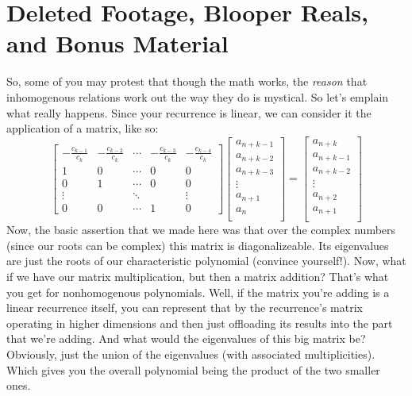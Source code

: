 \documentclass[12pt,letterpaper]{article}
\begin{document}
\section{Deleted Footage, Blooper Reals, and Bonus Material}
So, some of you may protest that though the math works, the \emph{reason} that
inhomogenous relations work out the way they do is mystical. So let's emplain
what really happens. Since your recurrence is linear, we can consider it the
application of a matrix, like so:
$$
\left[ \begin{array}{ccccc}
-\frac{c_{k-1}}{c_k} & -\frac{c_{k-2}}{c_k} & \cdots & -\frac{c_{k-3}}{c_k} & -\frac{c_{k-4}}{c_k} \\
1 & 0 & \cdots & 0 & 0 \\
0 & 1 & \cdots & 0 & 0 \\
\vdots && \ddots && \vdots \\
0 & 0 & \cdots & 1 & 0
\end{array} \right] \left[ \begin{array}{c}
a_{n+k-1} \\
a_{n+k-2} \\
a_{n+k-3} \\
\vdots \\
a_{n+1} \\
a_{n} \\
\end{array} \right] = \left[ \begin{array}{c}
a_{n+k} \\
a_{n+k-1} \\
a_{n+k-2} \\
\vdots \\
a_{n+2} \\
a_{n+1} \\
\end{array} \right]
$$
Now, the basic assertion that we made here was that over the complex numbers
(since our roots can be complex) this matrix is diagonalizeable. Its eigenvalues
are just the roots of our characteristic polynomial (convince yourself!). Now,
what if we have our matrix multiplication, but then a matrix addition? That's
what you get for nonhomogenous polynomials. Well, if the matrix you're adding
is a linear recurrence itself, you can represent that by the recurrence's matrix
operating in higher dimensions and then just offloading its results into the part
that we're adding. And what would the eigenvalues of this big matrix be? Obviously,
just the union of the eigenvalues (with associated multiplicities). Which gives
you the overall polynomial being the product of the two smaller ones.
\end{document}
